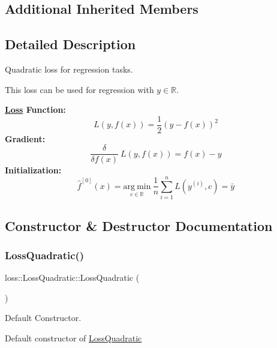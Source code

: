 \subsection*{Additional Inherited Members}


\subsection{Detailed Description}
Quadratic loss for regression tasks. 

This loss can be used for regression with $y \in \mathbb{R}$.

{\bfseries \hyperlink{classloss_1_1_loss}{Loss} Function\+:} \[ L(y, f(x)) = \frac{1}{2}\left( y - f(x) \right)^2 \] {\bfseries Gradient\+:} \[ \frac{\delta}{\delta f(x)}\ L(y, f(x)) = f(x) - y \] {\bfseries Initialization\+:} \[ \hat{f}^{[0]}(x) = \underset{c\in\mathbb{R}}{\mathrm{arg~min}}\ \frac{1}{n}\sum\limits_{i=1}^n L\left(y^{(i)}, c\right) = \bar{y} \] 

\subsection{Constructor \& Destructor Documentation}
\mbox{\label{classloss_1_1_loss_quadratic_ae1bc457d09db2e808cf7f4f80f92730a}} 
\subsubsection{\texorpdfstring{Loss\+Quadratic()}{LossQuadratic()}\hspace{0.1cm}{\footnotesize\ttfamily [1/2]}}
{\footnotesize\ttfamily loss\+::\+Loss\+Quadratic\+::\+Loss\+Quadratic (\begin{DoxyParamCaption}{ }\end{DoxyParamCaption})}



Default Constructor. 

Default constructor of {\ttfamily \hyperlink{classloss_1_1_loss_quadratic}{Loss\+Quadratic}} \mbox{\label{classloss_1_1_loss_quadratic_af3ac6ec45217231e7a0829c8501ccf1b}} 
